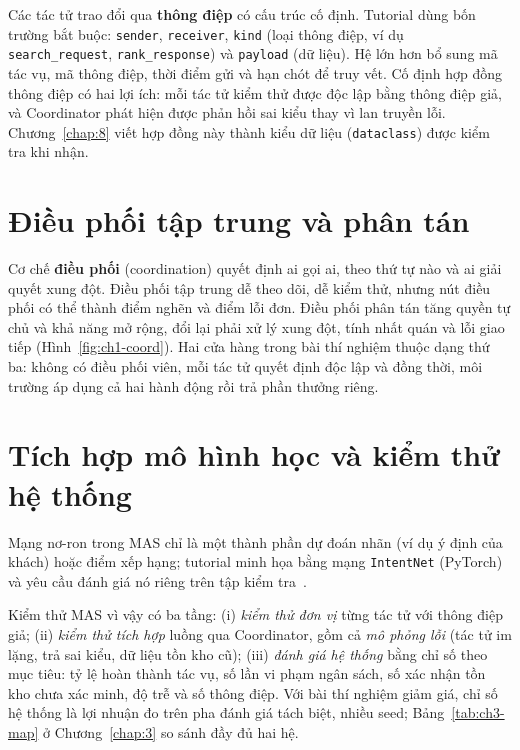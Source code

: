 Các tác tử trao đổi qua \textbf{thông điệp} có cấu trúc cố định. Tutorial dùng bốn trường bắt buộc:
\texttt{sender}, \texttt{receiver}, \texttt{kind} (loại thông điệp, ví dụ \texttt{search\_request},
\texttt{rank\_response}) và \texttt{payload} (dữ liệu). Hệ lớn hơn bổ sung mã tác vụ, mã thông điệp, thời điểm gửi
và hạn chót để truy vết. Cố định hợp đồng thông điệp có hai lợi ích: mỗi tác tử kiểm thử được độc lập bằng thông
điệp giả, và Coordinator phát hiện được phản hồi sai kiểu thay vì lan truyền lỗi. Chương~\ref{chap:8} viết hợp đồng
này thành kiểu dữ liệu (\texttt{dataclass}) được kiểm tra khi nhận.

\section{Điều phối tập trung và phân tán}

Cơ chế \textbf{điều phối} (coordination) quyết định ai gọi ai, theo thứ tự nào và ai giải quyết xung đột.
Điều phối tập trung dễ theo dõi, dễ kiểm thử, nhưng nút điều phối có thể thành điểm nghẽn và điểm lỗi đơn. Điều phối
phân tán tăng quyền tự chủ và khả năng mở rộng, đổi lại phải xử lý xung đột, tính nhất quán và lỗi giao tiếp
(Hình~\ref{fig:ch1-coord}). Hai cửa hàng trong bài thí nghiệm thuộc dạng thứ ba: không có điều phối viên, mỗi tác tử
quyết định độc lập và đồng thời, môi trường áp dụng cả hai hành động rồi trả phần thưởng riêng.



\section{Tích hợp mô hình học và kiểm thử hệ thống}

Mạng nơ-ron trong MAS chỉ là một thành phần dự đoán nhãn (ví dụ ý định của khách) hoặc điểm xếp hạng; tutorial
minh họa bằng mạng \texttt{IntentNet} (PyTorch) và yêu cầu đánh giá nó riêng trên tập kiểm tra~\cite{ch1:tutorial}.

Kiểm thử MAS vì vậy có ba tầng: (i) \emph{kiểm thử đơn vị} từng tác tử với thông điệp giả; (ii) \emph{kiểm thử
tích hợp} luồng qua Coordinator, gồm cả \emph{mô phỏng lỗi} (tác tử im lặng, trả sai kiểu, dữ liệu tồn kho cũ);
(iii) \emph{đánh giá hệ thống} bằng chỉ số theo mục tiêu: tỷ lệ hoàn thành tác vụ, số lần vi phạm ngân sách, số
xác nhận tồn kho chưa xác minh, độ trễ và số thông điệp. Với bài thí nghiệm giảm giá, chỉ số hệ thống là lợi nhuận
đo trên pha đánh giá tách biệt, nhiều seed; Bảng~\ref{tab:ch3-map} ở Chương~\ref{chap:3} so sánh đầy đủ hai hệ.
